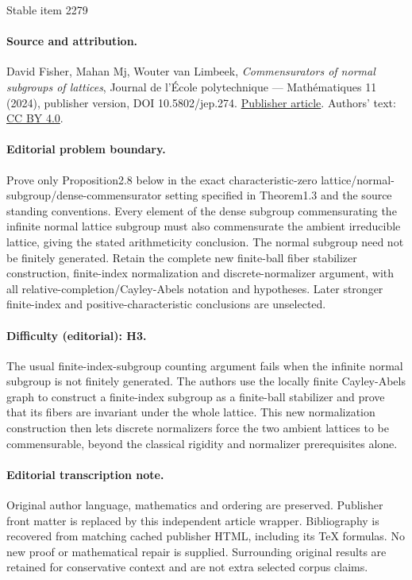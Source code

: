 \documentclass[11pt]{article}
\numberwithin{equation}{section}\providecommand{\llangle}{\langle\!\langle}\providecommand{\rrangle}{\rangle\!\rangle}\providecommand{\Asterisk}{\ast}
\theoremstyle{definition}
\begin{document}
\begin{center}{\Large Stable item 2279}\end{center}
\paragraph{Source and attribution.}
David Fisher, Mahan Mj, Wouter van Limbeek, \emph{Commensurators of normal subgroups of lattices}, Journal de l’École polytechnique — Mathématiques 11 (2024), publisher version, DOI 10.5802/jep.274. \href{https://jep.centre-mersenne.org/articles/10.5802/jep.274/}{Publisher article}. Authors' text: \href{https://creativecommons.org/licenses/by/4.0/}{CC BY 4.0}.
\paragraph{Editorial problem boundary.}
Prove only Proposition2.8 below in the exact characteristic-zero lattice/normal-subgroup/dense-commensurator setting specified in Theorem1.3 and the source standing conventions. Every element of the dense subgroup commensurating the infinite normal lattice subgroup must also commensurate the ambient irreducible lattice, giving the stated arithmeticity conclusion. The normal subgroup need not be finitely generated. Retain the complete new finite-ball fiber stabilizer construction, finite-index normalization and discrete-normalizer argument, with all relative-completion/Cayley-Abels notation and hypotheses. Later stronger finite-index and positive-characteristic conclusions are unselected.
\paragraph{Difficulty (editorial): H3.}
The usual finite-index-subgroup counting argument fails when the infinite normal subgroup is not finitely generated. The authors use the locally finite Cayley-Abels graph to construct a finite-index subgroup as a finite-ball stabilizer and prove that its fibers are invariant under the whole lattice. This new normalization construction then lets discrete normalizers force the two ambient lattices to be commensurable, beyond the classical rigidity and normalizer prerequisites alone.
\paragraph{Editorial transcription note.}
Original author language, mathematics and ordering are preserved. Publisher front matter is replaced by this independent article wrapper. Bibliography is recovered from matching cached publisher HTML, including its TeX formulas. No new proof or mathematical repair is supplied. Surrounding original results are retained for conservative context and are not extra selected corpus claims.
\clearpage
\end{document}
